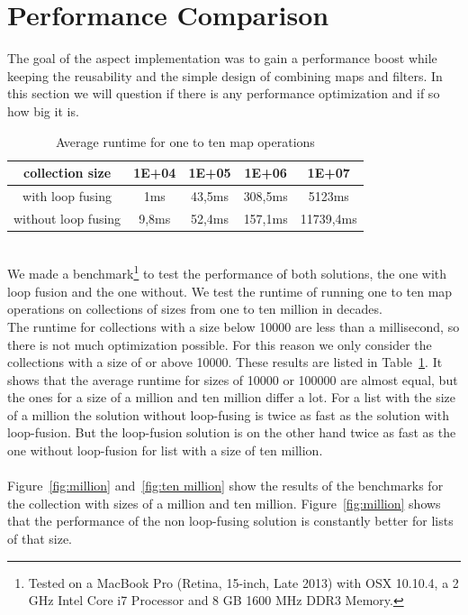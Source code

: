\documentclass[runningheads,a4paper]{llncs}
\begin{document}
\section{Performance Comparison}\label{sec:performance-comparison}
The goal of the aspect implementation was to gain a performance boost while keeping the reusability and the simple design of combining maps and filters.
In this section we will question if there is any performance optimization and if so how big it is.
\bgroup
\def\arraystretch{1.5}%
\begin{table}[]
\centering
\caption{Average runtime for one to ten map operations}
\begin{tabular}{|c|c|c|c|c|}
\hline
collection size     & 1E+04 & 1E+05 & 1E+06 & 1E+07 \\ \hline
with loop fusing    & 1ms   & 43,5ms & 308,5ms & 5123ms     \\ \hline
without loop fusing & 9,8ms & 52,4ms & 157,1ms & 11739,4ms    \\ \hline
\end{tabular}
\label{table:results}
\end{table}
\egroup
\\
We made a benchmark\footnote{Tested on a MacBook Pro (Retina, 15-inch, Late 2013) with OSX 10.10.4, a 2 GHz Intel Core i7 Processor and 8 GB 1600 MHz DDR3 Memory.} to test the performance of both solutions, the one with loop fusion and the one without.
We test the runtime of running one to ten map operations on collections of sizes from one to ten million in decades.\\
The runtime for collections with a size below 10000 are less than a millisecond, so there is not much optimization possible.
For this reason we only consider the collections with a size of or above 10000. These results are listed in Table~\ref{table:results}.
It shows that the average runtime for sizes of 10000 or 100000 are almost equal, but the ones for a size of a million and ten million differ a lot.
For a list with the size of a million the solution without loop-fusing is twice as fast as the solution with loop-fusion.
But the loop-fusion solution is on the other hand twice as fast as the one without loop-fusion for list with a size of ten million.\\
\\
Figure~\ref{fig:million} and~\ref{fig:ten million} show the results of the benchmarks for the collection with sizes of a million and ten million.
Figure~\ref{fig:million} shows that the performance of the non loop-fusing solution is constantly better for lists of that size.
\end{document}
